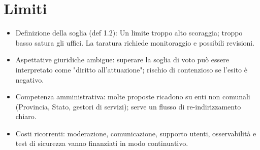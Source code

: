 \section{Limiti}

\begin{itemize}
  \item Definizione della soglia (def 1.2): Un limite troppo alto scoraggia; 
  troppo basso satura gli uffici. La taratura richiede monitoraggio e possibili 
  revisioni.

  \item Aspettative giuridiche ambigue: superare la soglia di voto può essere 
  interpretato come "diritto all'attuazione"; rischio di contenzioso se l'esito 
  è negativo.

  \item Competenza amministrativa: molte proposte ricadono su enti non comunali 
  (Provincia, Stato, gestori di servizi); serve un flusso di re-indirizzamento 
  chiaro.

  \item Costi ricorrenti: moderazione, comunicazione, supporto 
  utenti, osservabilità e test di sicurezza vanno finanziati in modo 
  continuativo.
\end{itemize}
